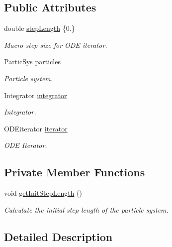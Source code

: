 \subsection*{Public Attributes}
\begin{DoxyCompactItemize}
\item 
double \mbox{\hyperlink{classdynamic_system_a0933282b8562cde1882defb383077c53}{step\+Length}} \{0.\}
\begin{DoxyCompactList}\small\item\em Macro step size for O\+DE iterator. \end{DoxyCompactList}\item 
Partic\+Sys \mbox{\hyperlink{classdynamic_system_aa61069ee367b9d1bb5bd2fedadba28fb}{particles}}
\begin{DoxyCompactList}\small\item\em Particle system. \end{DoxyCompactList}\item 
Integrator \mbox{\hyperlink{classdynamic_system_adf34beb841273d743821fd2df47e0aab}{integrator}}
\begin{DoxyCompactList}\small\item\em Integrator. \end{DoxyCompactList}\item 
O\+D\+Eiterator \mbox{\hyperlink{classdynamic_system_a4c308ab0538e69020fe50d1b53f94d25}{iterator}}
\begin{DoxyCompactList}\small\item\em O\+DE Iterator. \end{DoxyCompactList}\end{DoxyCompactItemize}
\subsection*{Private Member Functions}
\begin{DoxyCompactItemize}
\item 
void \mbox{\hyperlink{classdynamic_system_a9009d61ca09844f016ebc0d87467dba3}{get\+Init\+Step\+Length}} ()
\begin{DoxyCompactList}\small\item\em Calculate the initial step length of the particle system. \end{DoxyCompactList}\end{DoxyCompactItemize}


\subsection{Detailed Description}
